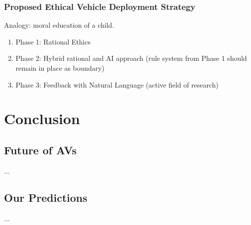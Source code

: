 \documentclass[11pt]{article}
\begin{document}
\subsubsection{Proposed Ethical Vehicle Deployment Strategy}
Analogy: moral education of a child.
\begin{enumerate}
\item Phase 1: Rational Ethics
\item Phase 2: Hybrid rational and AI approach (rule system from Phase 1 should remain in place as boundary)
\item Phase 3: Feedback with Natural Language (active field of research)
\end{enumerate}

\section{Conclusion}
\subsection{Future of AVs}
...
\subsection{Our Predictions}
...


%
%
\end{document}
